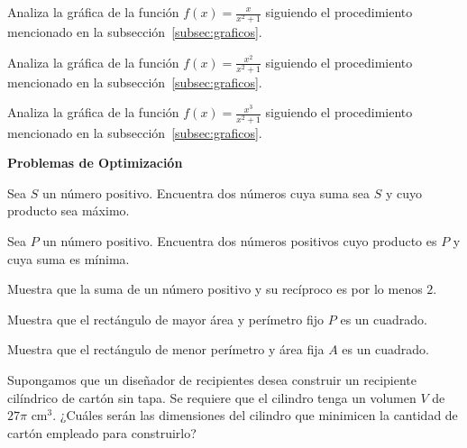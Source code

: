 \documentclass[12pt,a4paper]{book}
\newcommand{\subtitulo}[1]{\par\avoidorphan{5}\addvspace{\medskipamount}\noindent\textbf{#1}\par\nobreak}
\begin{document}
    \begin{ejercicio}\label{ej:303}
        Analiza la gráfica de la función $f(x)=\frac{x}{x^{2}+1}$ siguiendo el
        procedimiento mencionado en la subsección~\ref{subsec:graficos}.
    \end{ejercicio}

    \begin{ejercicio}\label{ej:304}
        Analiza la gráfica de la función $f(x)=\frac{x^{2}}{x^{2}+1}$ siguiendo el
        procedimiento mencionado en la subsección~\ref{subsec:graficos}.
    \end{ejercicio}

    \begin{ejercicio}\label{ej:305}
        Analiza la gráfica de la función $f(x)=\frac{x^{3}}{x^{2}+1}$ siguiendo el
        procedimiento mencionado en la subsección~\ref{subsec:graficos}.
    \end{ejercicio}

    \subtitulo{Problemas de Optimización}

    \begin{ejercicio}\label{ej:306}
        Sea $S$ un número positivo. Encuentra dos números cuya suma
        sea $S$ y cuyo producto sea máximo.
    \end{ejercicio}

    \begin{ejercicio}\label{ej:307}
        Sea $P$ un número positivo. Encuentra dos números positivos
        cuyo producto es $P$ y cuya suma es mínima.
    \end{ejercicio}

    \begin{ejercicio}\label{ej:308}
        Muestra que la suma de un número positivo y su recíproco
        es por lo menos $2$.
    \end{ejercicio}

    \begin{ejercicio}\label{ej:309}
        Muestra que el rectángulo de mayor área y perímetro fijo $P$
        es un cuadrado.
    \end{ejercicio}

    \begin{ejercicio}\label{ej:310}
        Muestra que el rectángulo de menor perímetro y área fija $A$
        es un cuadrado.
    \end{ejercicio}

    \begin{ejercicio}\label{ej:311}
        Supongamos que un diseñador de recipientes desea construir
        un recipiente cilíndrico de cartón sin tapa. Se requiere que el cilindro tenga
        un volumen $V$ de $27\pi$ cm$^{3}$. ¿Cuáles serán las dimensiones del cilindro que
        minimicen la cantidad de cartón empleado para construirlo?
    \end{ejercicio}
\end{document}
